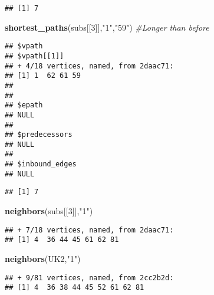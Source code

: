 \documentclass[
]{article}
\newenvironment{Shaded}{\begin{snugshade}}{\end{snugshade}}
\newcommand{\CommentTok}[1]{\textcolor[rgb]{0.56,0.35,0.01}{\textit{#1}}}
\newcommand{\DecValTok}[1]{\textcolor[rgb]{0.00,0.00,0.81}{#1}}
\newcommand{\KeywordTok}[1]{\textcolor[rgb]{0.13,0.29,0.53}{\textbf{#1}}}
\newcommand{\NormalTok}[1]{#1}
\newcommand{\StringTok}[1]{\textcolor[rgb]{0.31,0.60,0.02}{#1}}
\begin{document}
\begin{verbatim}
## [1] 7
\end{verbatim}

\begin{Shaded}
\begin{Highlighting}[]
\KeywordTok{shortest_paths}\NormalTok{(subs[[}\DecValTok{3}\NormalTok{]],}\StringTok{"1"}\NormalTok{,}\StringTok{"59"}\NormalTok{)       }\CommentTok{#Longer than before}
\end{Highlighting}
\end{Shaded}

\begin{verbatim}
## $vpath
## $vpath[[1]]
## + 4/18 vertices, named, from 2daac71:
## [1] 1  62 61 59
## 
## 
## $epath
## NULL
## 
## $predecessors
## NULL
## 
## $inbound_edges
## NULL
\end{verbatim}

\begin{Shaded}
\end{Shaded}

\begin{verbatim}
## [1] 7
\end{verbatim}

\begin{Shaded}
\begin{Highlighting}[]
\KeywordTok{neighbors}\NormalTok{(subs[[}\DecValTok{3}\NormalTok{]],}\StringTok{"1"}\NormalTok{)}
\end{Highlighting}
\end{Shaded}

\begin{verbatim}
## + 7/18 vertices, named, from 2daac71:
## [1] 4  36 44 45 61 62 81
\end{verbatim}

\begin{Shaded}
\begin{Highlighting}[]
\KeywordTok{neighbors}\NormalTok{(UK2,}\StringTok{"1"}\NormalTok{)}
\end{Highlighting}
\end{Shaded}

\begin{verbatim}
## + 9/81 vertices, named, from 2cc2b2d:
## [1] 4  36 38 44 45 52 61 62 81
\end{verbatim}
\end{document}
